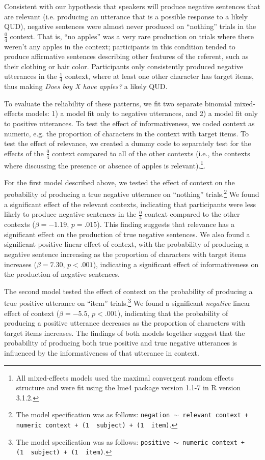 \documentclass[man, floatsintext, noapacite]{apa6}
\begin{document}
Consistent with our hypothesis that speakers will produce negative sentences that are relevant (i.e. producing an utterance that is a possible response to a likely QUD), negative sentences were almost never produced on ``nothing'' trials in the $\frac{0}{4}$ context. That is, ``no apples'' was a very rare production on trials where there weren't any apples in the context; participants in this condition tended to produce affirmative sentences describing other features of the referent, such as their clothing or hair color. Participants only consistently produced negative utterances in the $\frac{1}{4}$ context, where at least one other character has target items, thus making \textit{Does boy X have apples?} a likely QUD. 

To evaluate the reliability of these patterns, we fit two separate binomial mixed-effects models: 1) a model fit only to negative utterances, and 2) a model fit only to positive utterances. To test the effect of informativeness, we coded context as numeric, e.g. the proportion of characters in the context with target items. To test the effect of relevance, we created a dummy code to separately test for the effects of the  $\frac{0}{4}$ context compared to all of the other contexts (i.e., the contexts where discussing the presence or absence of apples is relevant).\footnote{All mixed-effects models used the maximal convergent random effects structure \cite{barr2013} and were fit using the lme4 package version 1.1-7 in R version 3.1.2.}.

For the first model described above, we tested the effect of context on the probability of producing a true negative utterance on ``nothing'' trials.\footnote{The model specification was as follows: \texttt{negation $\sim$  relevant context + numeric context + (1~\textbar~subject) +  (1~\textbar~item)}.} We  found a significant effect of the relevant contexts, indicating that participants were less likely to produce negative sentences in the $\frac{0}{4}$ context compared to the other contexts ($\beta= -1.19$, $p = .015$). This finding suggests that relevance has a significant effect on the production of true negative sentences. We also found a significant positive linear effect of context, with the probability of producing a negative sentence increasing as the proportion of characters with target items increases ($\beta= 7.30$, $p< .001$), indicating a significant effect of informativeness on the production of negative sentences. 

The second model tested the effect of context on the probability of producing a true positive utterance on ``item'' trials.\footnote{The model specification was as follows: \texttt{positive $\sim$  numeric context + (1~\textbar~subject) +  (1~\textbar~item)}.} We found a significant \textit{negative} linear effect of context ($\beta= -5.5$, $p< .001$), indicating that the probability of producing a positive utterance decreases as the proportion of characters with target items increases. The findings of both models together suggest that the probability of producing both true positive and true negative utterances is influenced by the informativeness of that utterance in context.
\end{document}
